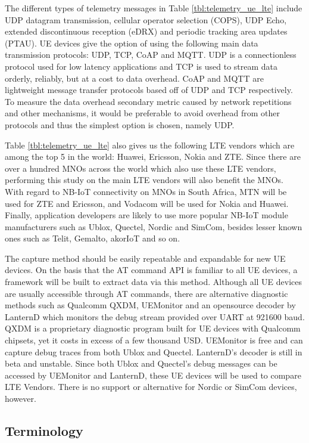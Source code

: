 \documentclass[]{article}
\begin{document}
The different types of telemetry messages in Table
\ref{tbl:telemetry_ue_lte} include UDP datagram transmission, cellular
operator selection (COPS), UDP Echo, extended discontinuous reception
(eDRX) and periodic tracking area updates (PTAU). UE devices give the
option of using the following main data transmission protocols: UDP,
TCP, CoAP and MQTT. UDP is a connectionless protocol used for low
latency applications and TCP is used to stream data orderly, reliably,
but at a cost to data overhead. CoAP and MQTT are lightweight message
transfer protocols based off of UDP and TCP respectively. To measure the
data overhead secondary metric caused by network repetitions and other
mechanisms, it would be preferable to avoid overhead from other
protocols and thus the simplest option is chosen, namely UDP.

Table \ref{tbl:telemetry_ue_lte} also gives us the following LTE vendors
which are among the top 5 in the world: Huawei, Ericsson, Nokia and ZTE.
Since there are over a hundred MNOs across the world which also use
these LTE vendors, performing this study on the main LTE vendors will
also benefit the MNOs. With regard to NB-IoT connectivity on MNOs in
South Africa, MTN will be used for ZTE and Ericsson, and Vodacom will be
used for Nokia and Huawei. Finally, application developers are likely to
use more popular NB-IoT module manufacturers such as Ublox, Quectel,
Nordic and SimCom, besides lesser known ones such as Telit, Gemalto,
akorIoT and so on.

The capture method should be easily repeatable and expandable for new UE
devices. On the basis that the AT command API is familiar to all UE
devices, a framework will be built to extract data via this method.
Although all UE devices are usually accessible through AT commands,
there are alternative diagnostic methods such as Qualcomm QXDM,
UEMonitor and an opensource decoder by LanternD which monitors the debug
stream provided over UART at 921600 baud. QXDM is a proprietary
diagnostic program built for UE devices with Qualcomm chipsets, yet it
costs in excess of a few thousand USD. UEMonitor is free and can capture
debug traces from both Ublox and Quectel. LanternD's decoder is still in
beta and unstable. Since both Ublox and Quectel's debug messages can be
accessed by UEMonitor and LanternD, these UE devices will be used to
compare LTE Vendors. There is no support or alternative for Nordic or
SimCom devices, however.

\hypertarget{terminology}{%
\subsection{Terminology}\label{terminology}}
\end{document}
